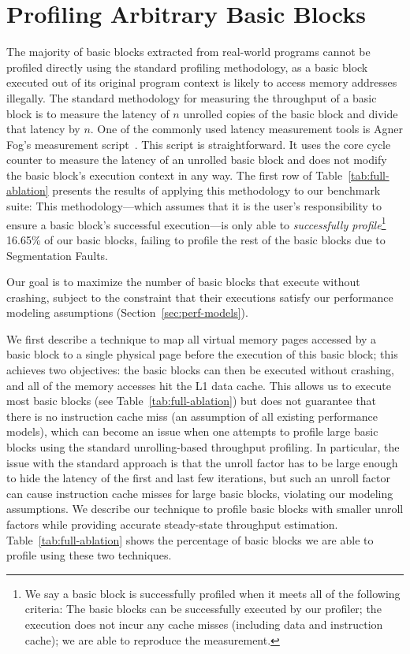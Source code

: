 \section{Profiling Arbitrary Basic Blocks}
The majority of basic blocks extracted from real-world programs cannot be profiled directly 
using the standard profiling methodology,
as a basic block executed out of its original program context is likely to access memory addresses illegally.
The standard methodology for measuring the throughput of a basic block
is to measure the latency of $n$ unrolled copies of the basic block
and divide that latency by $n$.
One of the commonly used latency measurement tools is Agner Fog's measurement script~\cite{agner}.
This script is straightforward. 
It uses the core cycle counter to measure the latency of an unrolled basic block and
does not modify the basic block's execution context in any way.
The first row of Table~\ref{tab:full-ablation} presents the results of applying
this methodology to our benchmark suite: 
This methodology---which assumes that it is the user's responsibility to ensure a basic block's successful execution---is only able to {\em successfully profile}\footnote{
We say a basic block is successfully profiled when it meets all of the following criteria:
The basic blocks can be successfully executed by our profiler;
the execution does not incur any cache misses (including data and instruction cache);
we are able to reproduce the measurement.
} 16.65\% of our basic blocks, failing to profile the rest of the basic 
blocks due to Segmentation Faults.

Our goal is to maximize the number of basic blocks that execute without crashing, subject to the constraint that their executions satisfy our performance modeling assumptions (Section~\ref{sec:perf-models}).

We first describe a technique to map all virtual memory pages accessed by a basic block
to a single physical page before the execution of this basic block;
this achieves two objectives: the basic blocks can then be executed without crashing,
and all of the memory accesses hit the L1 data cache.
This allows us to execute most basic blocks (see Table~\ref{tab:full-ablation})
but does not guarantee that there is no instruction cache
miss (an assumption of all existing performance models),
which can become an issue when one attempts to profile large basic blocks using
the standard unrolling-based throughput profiling.
In particular, the issue with the standard approach is that the unroll factor
has to be large enough to hide the latency of the first and last few iterations,
but such an unroll factor can cause instruction cache misses for large basic blocks,
violating our modeling assumptions.
We describe our technique to profile basic blocks with smaller
unroll factors while providing accurate steady-state throughput estimation.
Table~\ref{tab:full-ablation} shows the percentage of basic blocks
we are able to profile using these two techniques.

